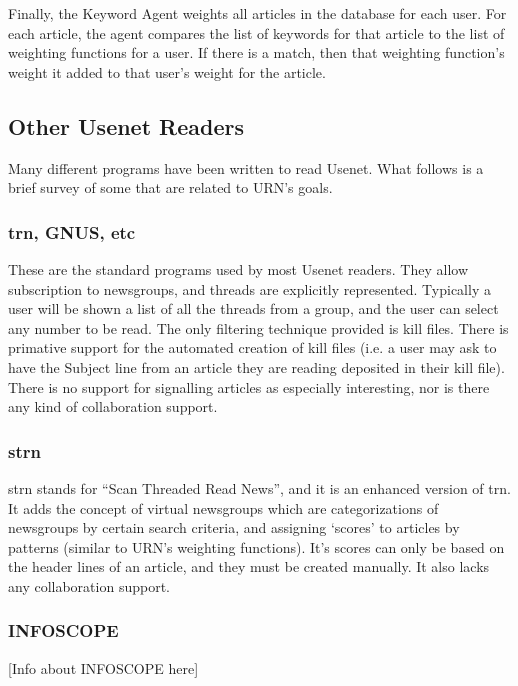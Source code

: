 Finally, the Keyword Agent weights all articles in the database for each user.
For each article, the agent compares the list of keywords for that article to
the list of weighting functions for a user. If there is a match, then that
weighting function's weight it added to that user's weight for the article.

\subsection{Other Usenet Readers}

Many different programs have been written to read Usenet. What follows is a
brief survey of some that are related to URN's goals.

\subsubsection{trn, GNUS, etc}

These are the standard programs used by most Usenet readers. They allow
subscription to newsgroups, and threads are explicitly represented. Typically a
user will be shown a list of all the threads from a group, and the user can
select any number to be read. The only filtering technique provided is kill
files. There is primative support for the automated creation of kill files
(i.e. a user may ask to have the Subject line from an article they are reading
deposited in their kill file). There is no support for signalling articles as
especially interesting, nor is there any kind of collaboration support.

\subsubsection{strn}

strn stands for ``Scan Threaded Read News'', and it is an enhanced version of
trn. It adds the concept of virtual newsgroups which are categorizations of
newsgroups by certain search criteria, and assigning `scores' to articles by
patterns (similar to URN's weighting functions). It's scores can only be based
on the header lines of an article, and they must be created manually. It also
lacks any collaboration support.

\subsubsection{INFOSCOPE}

[Info about INFOSCOPE here]

